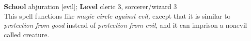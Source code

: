 \textbf{School} abjuration [evil]; \textbf{Level} cleric 3, sorcerer/wizard 3\\
This spell functions like \textit{magic circle against evil, }except that it is similar to \textit{protection from good }instead of \textit{protection from evil}, and it can imprison a nonevil called creature.\\
